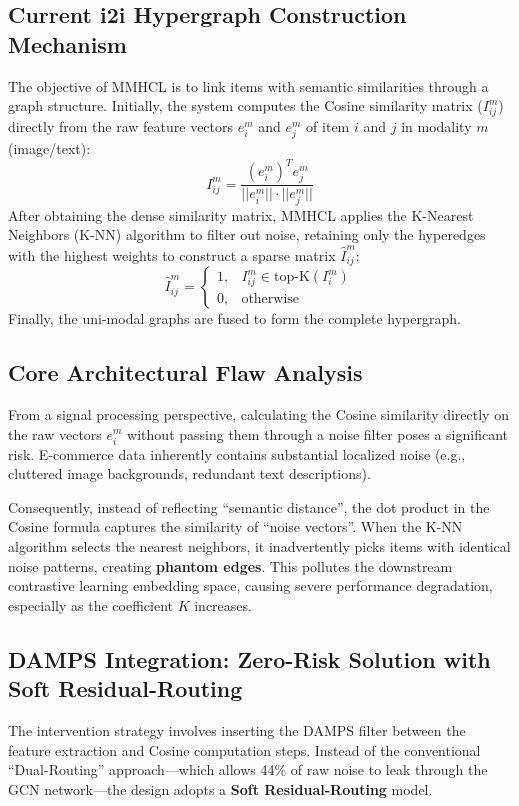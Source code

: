 \documentclass[12pt, a4paper]{article}
\begin{document}
\subsection{Current i2i Hypergraph Construction Mechanism}
The objective of MMHCL is to link items with semantic similarities through a graph structure. Initially, the system computes the Cosine similarity matrix ($I_{ij}^{m}$) directly from the raw feature vectors $e_i^m$ and $e_j^m$ of item $i$ and $j$ in modality $m$ (image/text):
\begin{equation}
I_{ij}^{m} = \frac{(e_i^m)^T e_j^m}{||e_i^m|| \cdot ||e_j^m||}
\end{equation}
After obtaining the dense similarity matrix, MMHCL applies the K-Nearest Neighbors (K-NN) algorithm to filter out noise, retaining only the hyperedges with the highest weights to construct a sparse matrix $\hat{I}_{ij}^{m}$:
\begin{equation}
\hat{I}_{ij}^{m} = \begin{cases} 1, & I_{ij}^{m} \in \text{top-K}(I_i^m) \\ 0, & \text{otherwise} \end{cases}
\end{equation}
Finally, the uni-modal graphs are fused to form the complete hypergraph.

\subsection{Core Architectural Flaw Analysis}
From a signal processing perspective, calculating the Cosine similarity directly on the raw vectors $e_i^m$ without passing them through a noise filter poses a significant risk. E-commerce data inherently contains substantial localized noise (e.g., cluttered image backgrounds, redundant text descriptions).

Consequently, instead of reflecting ``semantic distance'', the dot product in the Cosine formula captures the similarity of ``noise vectors''. When the K-NN algorithm selects the nearest neighbors, it inadvertently picks items with identical noise patterns, creating \textbf{phantom edges}. This pollutes the downstream contrastive learning embedding space, causing severe performance degradation, especially as the coefficient $K$ increases.

\subsection{DAMPS Integration: Zero-Risk Solution with Soft Residual-Routing}
The intervention strategy involves inserting the DAMPS filter between the feature extraction and Cosine computation steps. Instead of the conventional ``Dual-Routing'' approach---which allows 44\% of raw noise to leak through the GCN network---the design adopts a \textbf{Soft Residual-Routing} model.
\end{document}
